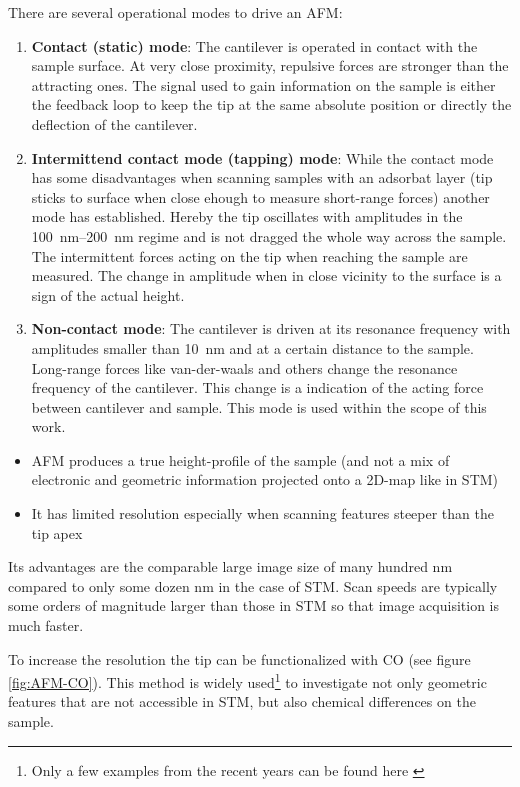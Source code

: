 There are several operational modes to drive an AFM:
\begin{enumerate}
 \item \textbf{Contact (static) mode}: The cantilever is operated in contact with the sample surface. At very close proximity, repulsive forces are stronger than the attracting ones. The signal used to gain information on the sample is either the feedback loop to keep the tip at the same absolute position or directly the deflection of the cantilever.
 \item \textbf{Intermittend contact mode (tapping) mode}: While the contact mode has some disadvantages when scanning samples with an adsorbat layer (tip sticks to surface when close ehough to measure short-range forces) another mode has established. Hereby the tip oscillates with amplitudes in the \SIrange{100}{200}{\nm} regime and is not dragged the whole way across the sample. The intermittent forces acting on the tip when reaching the sample are measured. The change in amplitude when in close vicinity to the surface is a sign of the actual height.
 \item \textbf{Non-contact mode}: The cantilever is driven at its resonance frequency with amplitudes smaller than \SI{10}{\nm} and at a certain distance to the sample. Long-range forces like van-der-waals and others change the resonance frequency of the cantilever. This change is a indication of the acting force between cantilever and sample. This mode is used within the scope of this work.
\end{enumerate}

\begin{itemize}
 \item AFM produces a true height-profile of the sample (and not a mix of electronic and geometric information projected onto a 2D-map like in STM)
 \item It has limited resolution especially when scanning features steeper than the tip apex
\end{itemize}

Its advantages are the comparable large image size of many hundred \si{\nm} compared to only some dozen \si{\nm} in the case of STM. Scan speeds are typically some orders of magnitude larger than those in STM so that image acquisition is much faster.

To increase the resolution the tip can be functionalized with CO (see figure \ref{fig:AFM-CO}). This method is widely used\footnote{Only a few examples from the recent years can be found here \cite{albrecht_direct_2016, kawai_multiple_2018, kawai_atomically_2015, schulz_elemental_2018, gross_chemical_2009, pavlicek_generation_2017, schwarz_corrugation_2017}} to investigate not only geometric features that are not accessible in STM, but also chemical differences on the sample\cite{wang_exploration_20170}.